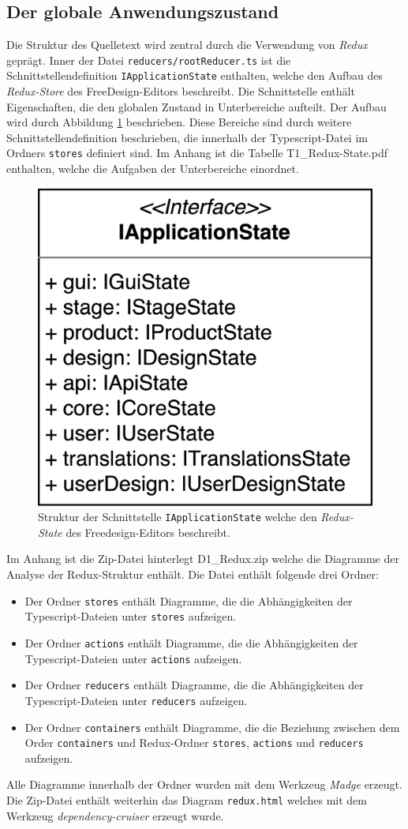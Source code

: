 \subsection{Der globale Anwendungszustand}
Die Struktur des Quelletext wird zentral durch die Verwendung von \emph{Redux} geprägt. Inner der Datei \lstinline|reducers/rootReducer.ts| ist die Schnittstellendefinition \lstinline|IApplicationState| enthalten, welche den Aufbau des \emph{Redux-Store} des FreeDesign-Editors beschreibt. Die Schnittstelle enthält Eigenschaften, die den globalen Zustand in Unterbereiche aufteilt. Der Aufbau wird durch Abbildung \ref{fig:IApplicationState} beschrieben. Diese Bereiche sind durch weitere Schnittstellendefinition beschrieben, die innerhalb der Typescript-Datei im Ordners \lstinline|stores| definiert sind. 
Im Anhang ist die Tabelle T1\_Redux-State.pdf enthalten, welche die Aufgaben der Unterbereiche einordnet. 


\begin{figure}[H]
    \centering
    \includegraphics[width=.3\textwidth]{diagrams/Ist-Architektur/IApplicationState.png}
    \caption{Struktur der Schnittstelle \lstinline|IApplicationState| welche den \emph{Redux-State} des Freedesign-Editors beschreibt.}
    \label{fig:IApplicationState}
\end{figure}


Im Anhang ist die Zip-Datei hinterlegt D1\_Redux.zip welche die Diagramme der Analyse der Redux-Struktur enthält.
Die Datei enthält folgende drei Ordner:  
\begin{itemize}
    \item Der Ordner \lstinline|stores| enthält Diagramme, die die Abhängigkeiten der Typescript-Dateien unter \lstinline|stores| aufzeigen.
    \item Der Ordner \lstinline|actions| enthält Diagramme, die die Abhängigkeiten der Typescript-Dateien unter \lstinline|actions| aufzeigen.
    \item Der Ordner \lstinline|reducers| enthält Diagramme, die die Abhängigkeiten der Typescript-Dateien unter \lstinline|reducers| aufzeigen. 
    \item Der Ordner \lstinline|containers| enthält Diagramme, die die Beziehung zwischen dem Order \lstinline|containers| und Redux-Ordner \lstinline|stores|, \lstinline|actions| und \lstinline|reducers| aufzeigen.
\end{itemize}
Alle Diagramme innerhalb der Ordner wurden mit dem Werkzeug \emph{Madge} erzeugt.
Die Zip-Datei enthält weiterhin das Diagram \lstinline|redux.html| welches mit dem Werkzeug \emph{dependency-cruiser} erzeugt wurde.

